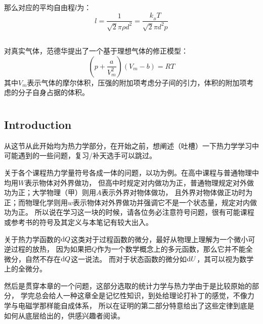             那么对应的平均自由程$l$为：
            \begin{equation}
                l =  \frac{1}{\sqrt{2}\pi \rho d^{2}} = \frac{k_{_B}T}{\sqrt{2}\pi d^{2}p}
                \nonumber
            \end{equation}
        \subsection[范德华状态方程]{}
            对真实气体，范德华提出了一个基于理想气体的修正模型：
            \begin{equation}
                (p+\frac{a}{V_{m}^{2}})(V_{m}-b)=RT
                \nonumber
            \end{equation}
            其中$V_m$表示气体的摩尔体积，压强的附加项考虑分子间的引力，体积的附加项考虑的分子自身占据的体积。
    \section[热力学第零定律]{}
        \subsection[引言]{Introduction}
            从这节从此开始均为热力学部分，在开始之前，想阐述（吐槽）一下热力学学习中可能遇到的一些问题，复习/补天选手可以跳过。
           
            关于各个课程热力学量符号各成一体的问题，以功为例。在高中课程与普通物理中均用$W$表示物体对外界做功，
            但高中时规定对内做功为正，普通物理规定对外做功为正；大学物理（甲）则用$A$表示外界对物体做功，
            且外界对物体做正功时为正；而物理化学则用$w$表示物体对外界做功并强调它不是一个状态量，规定对内做功为正。
            所以说在学习这一块的时候，请各位务必注意符号问题，很有可能课程或参考书的符号及其定义与本笔记有较大出入。

            关于热力学函数的$\mathrm{d}{Q}$这类对于过程函数的微分，最好从物理上理解为一个微小可逆过程的放热，
            因为如果把$Q$作为一个数学概念上的多元函数，那么它并不能全微分，自然不存在$\mathrm{d}{Q}$这一说法。
            而对于状态函数的微分如$\mathrm{d}{U}$，其可以视为数学上的全微分。

            然后是贯穿本章的一个问题，这部分选取的统计力学与热力学由于是比较原始的部分，
            学完总会给人一种这章全是记忆性知识，到处给理论打补丁的感觉，不像力学与电磁学那样能自成体系，
            所以在证明的第二部分特意给出了这些定律到底是如何从底层给出的，供感兴趣者阅读。
